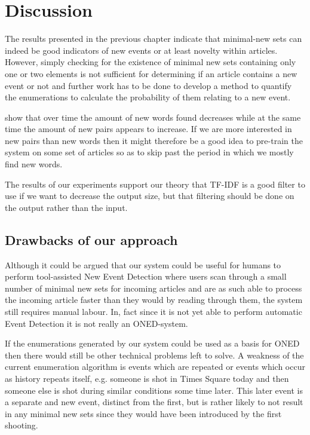\chapter{Discussion}
\label{chapter:discussion}
The results presented in the previous chapter indicate that minimal-new sets can indeed be good indicators of new events or at least novelty within articles. However, simply checking for the existence of minimal new sets containing only one or two elements is not sufficient for determining if an article contains a new event or not and further work has to be done to develop a method to quantify the enumerations to calculate the probability of them relating to a new event.

 show that over time the amount of new words found decreases while at the same time the amount of new pairs appears to increase. If we are more interested in new pairs than new words then it might therefore be a good idea to pre-train the system on some set of articles so as to skip past the period in which we mostly find new words.

The results of our experiments support our theory that TF-IDF is a good filter to use if we want to decrease the output size, but that filtering should be done on the output rather than the input.

\section{Drawbacks of our approach}
Although it could be argued that our system could be useful for humans to perform tool-assisted New Event Detection where users scan through a small number of minimal new sets for incoming articles and are as such able to process the incoming article faster than they would by reading through them, the system still requires manual labour. In, fact since it is not yet able to perform automatic Event Detection it is not really an ONED-system.

If the enumerations generated by our system could be used as a basis for ONED then there would still be other technical problems left to solve. 
A weakness of the current enumeration algorithm is events which are repeated or events which occur as history repeats itself, e.g. someone is shot in Times Square today and then someone else is shot during similar conditions some time later. This later event is a separate and new event, distinct from the first, but is rather likely to not result in any minimal new sets since they would have been introduced by the first shooting.

